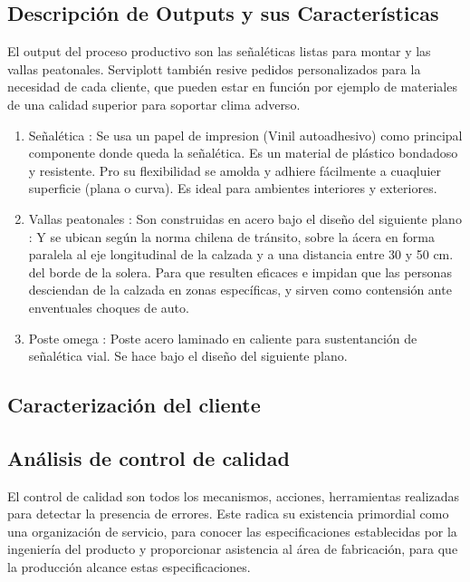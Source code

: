 	\subsection{Descripción de Outputs y sus Características}\label{output}
	El output del proceso productivo son las señaléticas listas para montar y las vallas peatonales. Serviplott también resive pedidos personalizados para la necesidad de cada cliente, que pueden estar en función por ejemplo de materiales de una calidad superior para soportar clima adverso.
	\begin{enumerate}[1)]
	\item Señalética : Se usa un papel de impresion (Vinil autoadhesivo) como principal componente donde queda la señalética. Es un material de plástico bondadoso y resistente. Pro su flexibilidad se amolda y adhiere fácilmente a cuaqluier superficie (plana o curva). Es ideal para ambientes interiores y exteriores.
	\item Vallas peatonales : Son construidas en acero bajo el diseño del siguiente plano : 
	Y se ubican según la norma chilena de tránsito, sobre la ácera en forma paralela al eje longitudinal de la calzada y a una distancia entre 30 y 50 cm. del borde de la solera. Para que resulten eficaces e impidan que las personas desciendan de la calzada en zonas específicas, y sirven como contensión ante enventuales choques de auto.
	\item Poste omega : Poste acero laminado en caliente para sustentanción de señalética vial. Se hace bajo el diseño del siguiente plano.
	\end{enumerate}
	\subsection{Caracterización del cliente}
    	
	
	\subsection{Análisis de control de calidad}
		El control de calidad son todos los mecanismos, acciones, herramientas realizadas para detectar la presencia de errores. Este radica su existencia primordial como una organización de servicio, para conocer las especificaciones establecidas por la ingeniería del producto y proporcionar asistencia al área de fabricación, para que la producción alcance estas especificaciones.	

